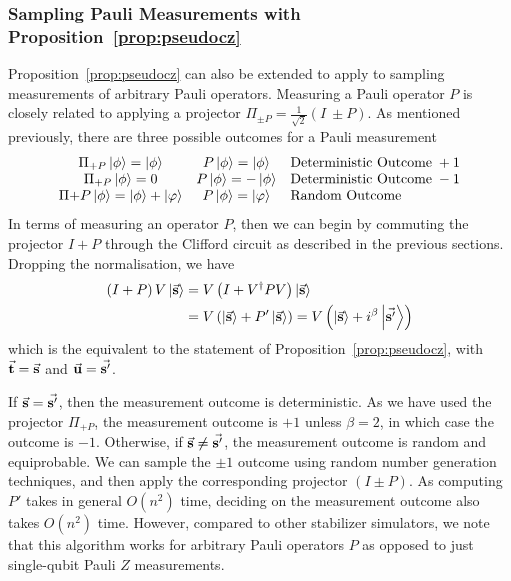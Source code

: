 \subsubsection{Sampling Pauli Measurements with Proposition~\ref{prop:pseudocz}}
Proposition~\ref{prop:pseudocz} can also be extended to apply to sampling measurements of arbitrary Pauli operators. Measuring a Pauli operator $P$ is closely related to applying a projector $\Pi_{\pm P}=\frac{1}{\sqrt{2}}\left(I\ \pm P\right)$. As mentioned previously, there are three possible outcomes for a Pauli measurement
\[
\begin{array}{c c l}
\Pi_{+P}\ket{\phi} = \ket{\phi} & P\ket{\phi} = \ket{\phi} & \text{Deterministic Outcome}\;+1\\
\Pi_{+P}\ket{\phi} = 0 & P\ket{\phi} = -\ket{\phi} & \text{Deterministic Outcome}\; -1\\
\Pi{+P}\ket{\phi} = \ket{\phi}+\ket{\varphi} & P\ket{\phi}=\ket{\varphi} & \text{Random Outcome} \\
\end{array}
\]
In terms of measuring an operator $P$, then we can begin by commuting the projector $I+P$ through the Clifford circuit as described in the previous sections. Dropping the normalisation, we have
\begin{align*}
\left(I+P\right)V\ket{\va{s}} &= V\left(I+V^{\dagger}PV\right)\ket{\va{s}} \\
& = V\left(\ket{\va{s}}+P'\ket{\va{s}}\right) = V\left(\ket{\va{s}}+i^{\beta}\ket{\va{s'}}\right)
\end{align*}
which is the equivalent to the statement of Proposition~\ref{prop:pseudocz}, with $\va{t}=\va{s}$ and $\va{u}=\va{s'}$.\par
If $\va{s}=\va{s'}$, then the measurement outcome is deterministic. As we have used the projector $\Pi_{+P}$, the measurement outcome is $+1$ unless $\beta=2$, in which case the outcome is $-1$. Otherwise, if $\va{s}\neq \va{s'}$, the measurement outcome is random and equiprobable. We can sample the $\pm 1$ outcome using random number generation techniques, and then apply the corresponding projector $\left(I\pm P\right)$. As computing $P'$ takes in general $O(n^{2})$ time, deciding on the measurement outcome also takes $O(n^{2})$ time. However, compared to other stabilizer simulators, we note that this algorithm works for arbitrary Pauli operators $P$ as opposed to just single-qubit Pauli $Z$ measurements.
